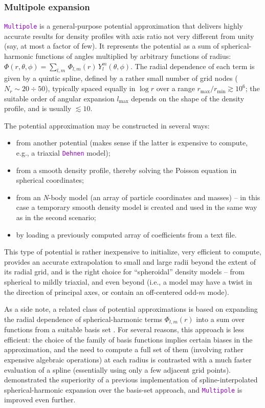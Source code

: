 \documentclass[12pt]{article}
\newcommand{\Nbody}{\textsl{N}-body\xspace}
\newcommand{\ttt}[1]{\textcolor{darkviolet}{\texttt{#1}}}
\begin{document}
\subsubsection{Multipole expansion}  \label{sec:PotentialMultipole}

\ttt{Multipole} is a general-purpose potential approximation that delivers highly accurate results for density profiles with axis ratio not very different from unity (say, at most a factor of few). It represents the potential as a sum of spherical-harmonic functions of angles multiplied by arbitrary functions of radius: $\Phi(r,\theta,\phi) = \sum_{l,m}\, \Phi_{l,m}(r)\, Y_l^m(\theta,\phi)$. The radial dependence of each term is given by a quintic spline, defined by a rather small number of grid nodes ($N_r\sim 20\div 50$), typically spaced equally in $\log r$ over a range $r_\mathrm{max}/r_\mathrm{min} \gtrsim 10^6$; the suitable order of angular expansion $l_\mathrm{max}$ depends on the shape of the density profile, and is usually $\lesssim 10$.

The potential approximation may be constructed in several ways:
\begin{itemize} \setlength{\parskip}{0pt} \setlength{\itemsep}{2pt}
\item from another potential (makes sense if the latter is expensive to compute, e.g., a triaxial \ttt{Dehnen} model);
\item from a smooth density profile, thereby solving the Poisson equation in spherical coordinates;
\item from an \Nbody model (an array of particle coordinates and masses) -- in this case a temporary smooth density model is created and used in the same way as in the second scenario;
\item by loading a previously computed array of coefficients from a text file.
\end{itemize}

This type of potential is rather inexpensive to initialize, very efficient to compute, provides an accurate extrapolation to small and large radii beyond the extent of its radial grid, and is the right choice for ``spheroidal'' density models -- from spherical to mildly triaxial, and even beyond (i.e., a model may have a twist in the direction of principal axes, or contain an off-centered odd-$m$ mode).

As a side note, a related class of potential approximations is based on expanding the radial dependence of spherical-harmonic terms $\Phi_{l,m}(r)$ into a sum over functions from a suitable basis set \cite{HernquistOstriker1992,Zhao1996}. For several reasons, this approach is less efficient: the choice of the family of basis functions implies certain biases in the approximation, and the need to compute a full set of them (involving rather expensive algebraic operations) at each radius is contrasted with a much faster evaluation of a spline (essentially using only a few adjacent grid points). \cite{Vasiliev2013} demonstrated the superiority of a previous implementation of spline-interpolated spherical-harmonic expansion over the basis-set approach, and \ttt{Multipole} is improved even further. 
\end{document}
